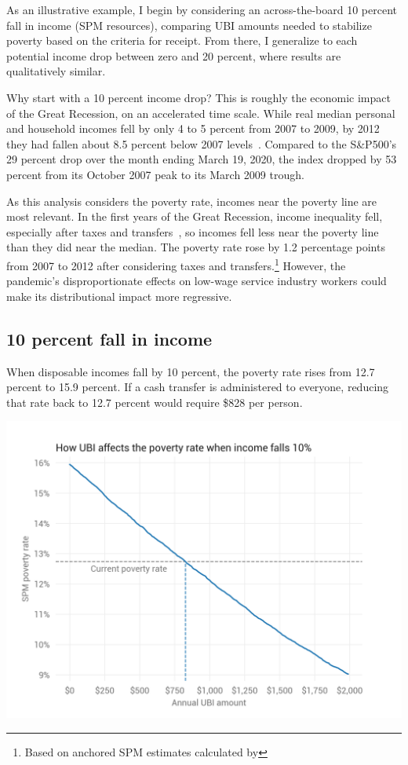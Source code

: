 \documentclass[12pt]{article}
\begin{document}
As an illustrative example, I begin by considering an across-the-board 10 percent fall in income (SPM resources), comparing UBI amounts needed to stabilize poverty based on the criteria for receipt. From there, I generalize to each potential income drop between zero and 20 percent, where results are qualitatively similar.

Why start with a 10 percent income drop? This is roughly the economic impact of the Great Recession, on an accelerated time scale. While real median personal and household incomes fell by only 4 to 5 percent from 2007 to 2009, by 2012 they had fallen about 8.5 percent below 2007 levels~\cite{fred_income}. Compared to the S\&P500's 29 percent drop over the month ending March 19, 2020, the index dropped by 53 percent from its October 2007 peak to its March 2009 trough.

As this analysis considers the poverty rate, incomes near the poverty line are most relevant. In the first years of the Great Recession, income inequality fell, especially after taxes and transfers~\cite{cbo}, so incomes fell less near the poverty line than they did near the median. The poverty rate rose by 1.2 percentage points from 2007 to 2012 after considering taxes and transfers.\footnote{Based on anchored SPM estimates calculated by } However, the pandemic's disproportionate effects on low-wage service industry workers could make its distributional impact more regressive.

\subsection{10 percent fall in income} \label{sec:10pctfall}

When disposable incomes fall by 10 percent, the poverty rate rises from 12.7 percent to 15.9 percent. If a cash transfer is administered to everyone, reducing that rate back to 12.7 percent would require \$828 per person.

\begin{center}
\includegraphics[width=15cm]{pov_rate_by_ubi_10pct_all}
\label{fig:pov_rate_by_ubi_10pct_all}
\end{center}
\end{document}
